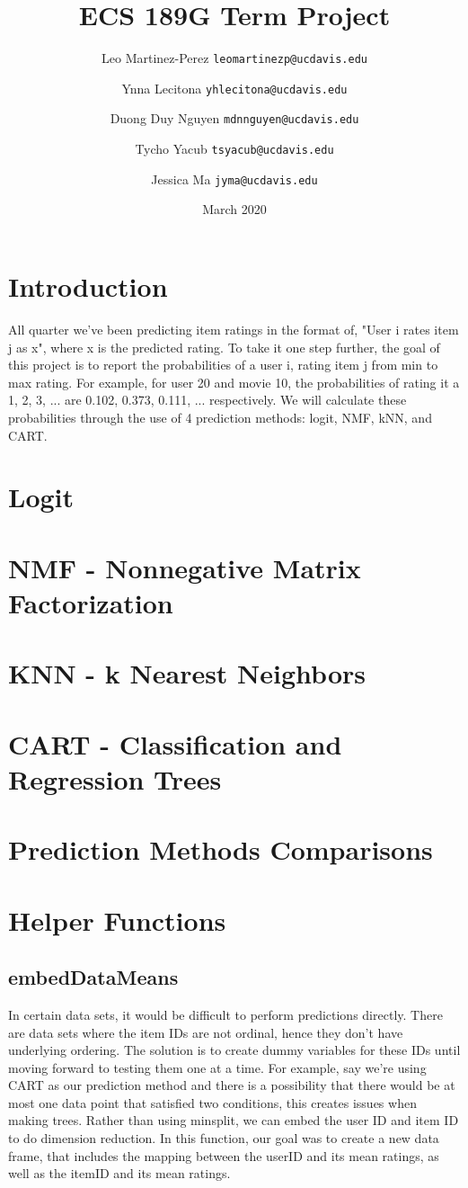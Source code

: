 \documentclass{article}
\title{ECS 189G Term Project}
\author{Leo Martinez-Perez
    \texttt{leomartinezp@ucdavis.edu}
    \and Ynna Lecitona
    \texttt{yhlecitona@ucdavis.edu}
    \and Duong Duy Nguyen
    \texttt{mdnnguyen@ucdavis.edu}
    \and Tycho Yacub
    \texttt{tsyacub@ucdavis.edu}
    \and Jessica Ma
    \texttt{jyma@ucdavis.edu}
}
\date{March 2020}
\begin{document}
\maketitle

\section{Introduction}
All quarter we've been predicting item ratings in the format of, "User i rates item j as x", where x is the predicted rating. To take it one step further, the goal of this project is to report the probabilities of a user i, rating item j from min to max rating. For example, for user 20 and movie 10, the probabilities of rating it a 1, 2, 3, ... are 0.102, 0.373, 0.111, ... respectively. We will calculate these probabilities through the use of 4 prediction methods: logit, NMF, kNN, and CART.

\section{Logit}

\section{NMF - Nonnegative Matrix Factorization}

\section{KNN - k Nearest Neighbors}

\section{CART - Classification and Regression Trees}

\section{Prediction Methods Comparisons}

\section{Helper Functions}
\subsection{embedDataMeans}
In certain data sets, it would be difficult to perform predictions directly. There are data sets where the item IDs are not ordinal, hence they don't have underlying ordering. The solution is to create dummy variables for these IDs until moving forward to testing them one at a time. 
For example, say we're using CART as our prediction method and there is a possibility that there would be at most one data point that satisfied two conditions, this creates issues when making trees. Rather than using minsplit, we can embed the user ID and item ID to do dimension reduction. In this function, our goal was to create a new data frame, that includes the mapping between the userID and its mean ratings, as well as the itemID and its mean ratings. 
\end{document}
